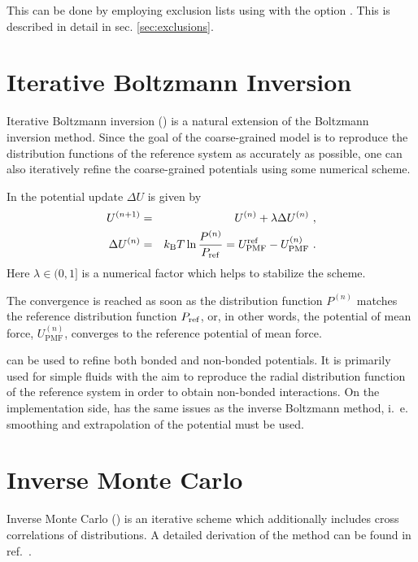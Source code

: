 This can be done by employing exclusion lists using  with the option . This is described in detail in sec. \ref{sec:exclusions}.


\section{Iterative Boltzmann Inversion}
\label{sec:ibi}

Iterative Boltzmann inversion (\ibi) is a natural extension of the Boltzmann inversion method. Since the goal of the coarse-grained model is to reproduce the distribution functions of the reference system as accurately as possible, one can also iteratively refine the coarse-grained potentials using some numerical scheme.

In \ibi the potential update $\Delta U$ is given by~\cite{Reith:2003}
\begin{eqnarray}
  \label{eq:iter_boltzmann}
  U^{(n+1)} &=& U^{(n)} + \lambda \Delta U^{(n)}~, \\
  \Delta U^{(n)} &=&  k_\text{B} T \ln  \frac{P^{(n)}}{P_{\rm ref}}
  =  U_\text{PMF}^\text{ref} - U_\text{PMF}^{(n)}~.
\end{eqnarray}
Here $\lambda \in (0,1]$ is a numerical factor which helps to stabilize the scheme.

The convergence is reached as soon as the distribution function $P^{(n)}$ matches the reference distribution function $P_{\rm ref}$, or, in other words, the potential of mean force, $U_\text{PMF}^{(n)}$, converges to the reference potential of mean force.

\ibi can be used to refine both bonded and non-bonded potentials. It is primarily used for simple fluids with the aim to reproduce the radial distribution function of the reference system in order to obtain non-bonded interactions. On the implementation side, \ibi has the same issues as the inverse Boltzmann method, i.~e. smoothing and extrapolation of the potential must be used.


\section{Inverse Monte Carlo}
\label{sec:imc}

Inverse Monte Carlo (\imc) is an iterative scheme which additionally includes cross correlations of distributions. A detailed derivation of the \imc method can be found in ref.~\cite{Lyubartsev:1995}.

